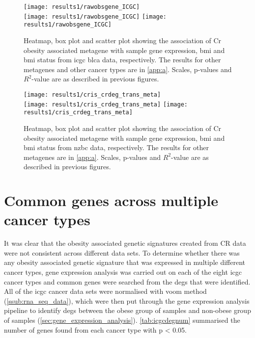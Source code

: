 \begin{figure}[htp!]
	\centering
	\texttt{[image: results1/rawobsgene\_ICGC]}\\
	\vspace{1em}
	\texttt{[image: results1/rawobsgene\_ICGC]}
	\hfill
	\texttt{[image: results1/rawobsgene\_ICGC]}
	\caption[Cr obesity associated metagene in \acrshort{icgc} \acrshort{blca} data]{Heatmap, box plot and scatter plot showing the association of Cr obesity associated metagene with sample gene expression, \gls{bmi} and \gls{bmi} status from \acrshort{icgc} \acrshort{blca} data, respectively.
	The results for other metagenes and other cancer types are in \cref{app:a}.
	Scales, p-values and $R^2$-value are as described in previous figures.}
	\label{fig:degmetaicgc}
\end{figure}

\begin{figure}[htp!]
	\centering
	\texttt{[image: results1/cris\_crdeg\_trans\_meta]}\\
	\vspace{1em}
	\texttt{[image: results1/cris\_crdeg\_trans\_meta]}
	\hfill
	\texttt{[image: results1/cris\_crdeg\_trans\_meta]}
	\caption[Cr obesity associated metagene in \gls{nzbc} data]{Heatmap, box plot and scatter plot showing the association of Cr obesity associated metagene with sample gene expression, \gls{bmi} and \gls{bmi} status from \gls{nzbc} data, respectively.
	The results for other metagenes are in \cref{app:a}.
	Scales, p-values and $R^2$-value are as described in previous figures.}
	\label{fig:degmetaprint}
\end{figure}

\section{Common genes across multiple cancer types}
\label{sec:common_genes_across_multiple_cancer_types}

It was clear that the obesity associated genetic signatures created from CR data were not consistent across different data sets.
To determine whether there was any obesity associated genetic signature that was expressed in multiple different cancer types, gene expression analysis was carried out on each of the eight \gls{icgc} cancer types and common genes were searched from the \glspl{deg} that were identified.
All of the \gls{icgc} cancer data sets were normalised with voom method (\cref{ssub:rna_seq_data}), which were then put through the gene expression analysis pipeline to identify \glspl{deg} between the obese group of samples and non-obese group of samples (\cref{sec:gene_expression_analysis}).
\cref{tab:icgcdegnum} summarised the number of genes found from each cancer type with p \textless{} 0.05.

